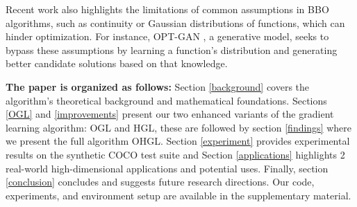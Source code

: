Recent work also highlights the limitations of common assumptions in BBO algorithms, such as continuity or Gaussian distributions of functions, which can hinder optimization. For instance, OPT-GAN \cite{tang2021guiding}, a generative model, seeks to bypass these assumptions by learning a function’s distribution and generating better candidate solutions based on that knowledge.

\textbf{The paper is organized as follows:} Section \ref{background} covers the algorithm’s theoretical background and mathematical foundations. Sections \ref{OGL} and \ref{improvements} present our two enhanced variants of the gradient learning algorithm: OGL and HGL, these are followed by section \ref{findings} where we present the full algorithm OHGL. Section \ref{experiment} provides experimental results on the synthetic COCO test suite and Section \ref{applications} highlights 2 real-world high-dimensional applications and potential uses. Finally, section \ref{conclusion} concludes and suggests future research directions. Our code, experiments, and environment setup are available in the supplementary material.
